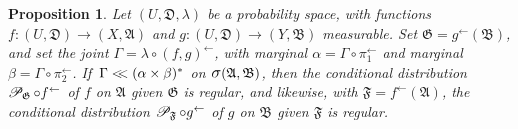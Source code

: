 \documentclass[
twoside=true,
paper=letter,
fontsize=11pt,
pagesize=auto,
leqno,
openany,
headsepline,
overfullrule,
]{scrbook}
\theoremstyle{plain}
\theoremstyle{plain}
\newtheorem{prop}[thm]{Proposition}
\theoremstyle{definition}
\theoremstyle{bfnoteitalic}
\theoremstyle{bfnoteroman}
\newcommand{\sigalg}[1]{\mathfrak{#1}}
\newcommand{\cali}[1]{\mathscr{#1}}
\newcommand{\condprobop}[1]{\mathop{\cali{P}\hspace{-1pt}}\nolimits_{#1}}
\newcommand{\sagb}{\mathop{\hbox{\large{$\sigma$}}}\nolimits}
\newcommand{\preimage}[1]{#1^{\leftarrow}}
\newcommand{\sigmaalgebra}{\sigalg{A}}
\newcommand{\sigmaalgebraii}{\sigalg{B}}
\newcommand{\productsig}[2]{\sagb(#1,#2)}
\newcommand{\funcf}{f}
\newcommand{\funcg}{g}
\newcommand{\measurespace}{X}
\newcommand{\measurespaceii}{Y}
\newcommand{\abscont}{\mathrel{< \kern-3.5pt <}}
\newcommand{\measlambda}{\lambda}
\newcommand{\projectionone}{\pi_1}
\newcommand{\projectiontwo}{\pi_2}
\newcommand{\uspace}{U}%
\newcommand{\uspacesig}{\sigalg{D}}
\newcommand{\measonprod}{\Gamma}%
\newcommand{\marginalone}{\alpha}%
\newcommand{\marginaltwo}{\beta}%
\begin{document}
\begin{prop}\label{absolute_continuity_regular}
Let
$(\uspace, \uspacesig, \measlambda)$
be a probability space, with functions
$\funcf:(\uspace,\uspacesig)\to (\measurespace,\sigmaalgebra)$
and
$\funcg:(\uspace,\uspacesig)\to (\measurespaceii,\sigmaalgebraii)$
measurable.
Set
$\sigalg{G} = \preimage{\funcg}(\sigmaalgebraii)$,
and set the joint
$\measonprod = \measlambda\circ\preimage{({\funcf,\funcg})}$,
with marginal
$\marginalone = \measonprod\circ \preimage{\projectionone}$
and marginal
$\marginaltwo = \measonprod\circ \preimage{\projectiontwo}$.
If\,
$\measonprod \abscont (\marginalone\times\marginaltwo)^*$
on
$\productsig{\sigmaalgebra}{\sigmaalgebraii}$,
then the conditional distribution
$\condprobop{\sigalg{G}}\circ \preimage{\funcf}$ of $\funcf$ on
$\sigmaalgebra$ given $\sigalg{G}$ is regular, and likewise, with
$\sigalg{F} = \preimage{\funcf}(\sigmaalgebra)$, the conditional distribution
$\condprobop{\sigalg{F}}\circ \preimage{\funcg}$ of $\funcg$ on
$\sigmaalgebraii$ given $\sigalg{F}$ is regular.
\end{prop}
\end{document}
